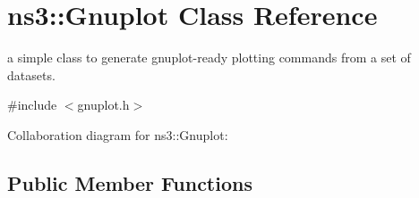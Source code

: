 \hypertarget{classns3_1_1Gnuplot}{}\section{ns3\+:\+:Gnuplot Class Reference}
\label{classns3_1_1Gnuplot}


a simple class to generate gnuplot-\/ready plotting commands from a set of datasets.  




{\ttfamily \#include $<$gnuplot.\+h$>$}



Collaboration diagram for ns3\+:\+:Gnuplot\+:
\subsection*{Public Member Functions}

